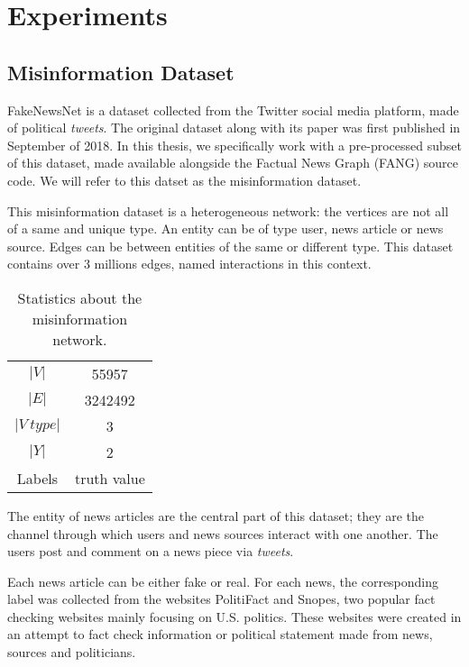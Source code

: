 
\chapter{Experiments} %
\label{cha:Experiments}

\section{Misinformation Dataset}

FakeNewsNet is a dataset collected from the Twitter social media platform, made of political \textit{tweets}.
The original dataset along with its paper was first published in September of 2018.
In this thesis, we specifically work with a pre-processed subset of this dataset, made available alongside the Factual News Graph (FANG) source code. We will refer to this datset as the misinformation dataset.

This misinformation dataset is a heterogeneous network: the vertices are not all of a same and unique type.
An entity can be of type user, news article or news source.
Edges can be between entities of the same or different type.
This dataset contains over 3 millions edges, named interactions in this context.

\begin{table}[h]
    \centering
    \caption{Statistics about the misinformation network.}
    \label{tab:dataset:network}
    \begin{tabular}{cc}
        \toprule
        $|V|$ & 55957\\
        $|E|$ & 3242492\\
        $|V\ type|$ & 3\\
        $|Y|$ & 2\\
        Labels & truth value\\
        \bottomrule
    \end{tabular}
\end{table}

The entity of news articles are the central part of this dataset; they are the channel through which users and news sources interact with one another. The users post and comment on a news piece via \textit{tweets}.

Each news article can be either fake or real. 
For each news, the corresponding label was collected from the websites PolitiFact and Snopes, two popular fact checking websites mainly focusing on U.S. politics.
These websites were created in an attempt to fact check information or political statement made from news, sources and politicians.

